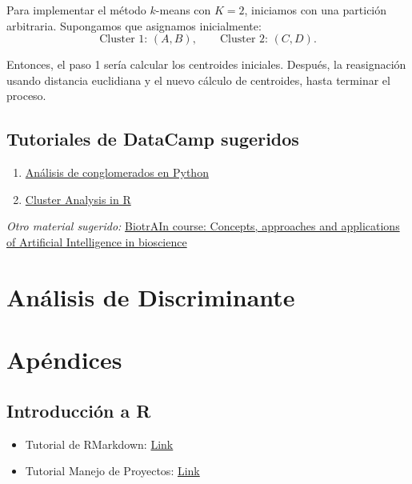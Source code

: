 \documentclass[
]{book}
\begin{document}
Para implementar el método \(k\)-means con \(K=2\), iniciamos con una partición arbitraria. Supongamos que asignamos inicialmente:
\[
\text{Cluster 1: } (A,B), \qquad \text{Cluster 2: } (C,D).
\]

Entonces, el paso 1 sería calcular los centroides iniciales. Después, la reasignación usando distancia euclidiana y el nuevo cálculo de centroides, hasta terminar el proceso.

\section{Tutoriales de DataCamp sugeridos}\label{tutoriales-de-datacamp-sugeridos-1}

\begin{enumerate}
\def\labelenumi{\arabic{enumi})}
\item
  \href{http://app.datacamp.com/learn/courses/cluster-analysis-in-python}{Análisis de conglomerados en Python}
\item
  \href{https://app.datacamp.com/learn/courses/cluster-analysis-in-r}{Cluster Analysis in R}
\end{enumerate}

\emph{Otro material sugerido:} \href{https://github.com/biotrain-latam/BiotrAIn-pilot-course/tree/main/Module\%202\%20Clustering}{BiotrAIn course: Concepts, approaches and applications of Artificial Intelligence in bioscience}

\chapter{Análisis de Discriminante}\label{anuxe1lisis-de-discriminante}

\chapter{Apéndices}\label{apuxe9ndices}

\section{Introducción a R}\label{introducciuxf3n-a-r}

\begin{itemize}
\item
  Tutorial de RMarkdown: \href{https://github.com/HaydeePeruyero/Rmarkdown_and_LaTeX/blob/main/ejemplo.Rmd}{Link}
\item
  Tutorial Manejo de Proyectos: \href{https://haydeeperuyero.github.io/Seminario_Estadistica/manejo-de-proyectos.html}{Link}
\end{itemize}
\end{document}
